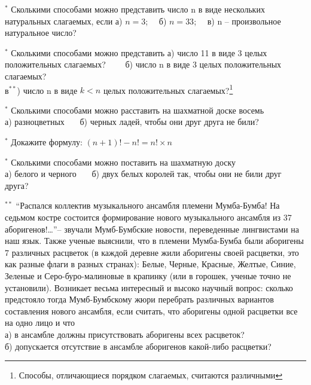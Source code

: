 
\begin{thm}
	$^{\ast}$ Сколькими способами можно представить число n в виде нескольких натуральных слагаемых, если а) $n = 3$;~~ б) $n = 33$;~~ в) n -- произвольное натуральное число?
\end{thm}

\begin{thm}
	$^{\ast}$ Сколькими способами можно представить
	а) число 11 в виде 3 целых положительных слагаемых?~~~~
	б) число n в виде 3 целых положительных слагаемых?\\
	в$^{\ast\ast}$) число n в виде  $k < n$  целых положительных слагаемых?\footnote{Способы, отличающиеся порядком слагаемых, считаются различными}
\end{thm}

\begin{thm}
	$^{\ast}$ Сколькими способами можно расставить на шахматной доске восемь\\ а) разноцветных~~~  б) черных ладей, чтобы они друг друга не били?
\end{thm}

\begin{thm}
	$^{\ast}$ Докажите формулу: $(n + 1)! - n! = n!\times n$
\end{thm}

\begin{thm}
	$^{\ast}$ Сколькими способами можно поставить на шахматную доску\\ а) белого и черного~~~ б) двух белых королей так, чтобы они не били друг друга?
\end{thm}

\begin{thm}$^{\ast\ast}$
	\textquotedblleft Распался коллектив музыкального ансамбля племени Мумба-Бумба! На седьмом костре состоится формирование нового музыкального ансамбля из 37 аборигенов!…\textquotedblright -- звучали Мумб-Бумбские новости, переведенные лингвистами на наш язык. Также ученые выяснили, что в племени Мумба-Бумба были аборигены 7 различных расцветок (в каждой деревне жили аборигены своей расцветки, это как разные флаги в разных странах): Белые, Черные, Красные, Желтые, Синие, Зеленые и Серо-буро-малиновые в крапинку (или в горошек, ученые точно не установили). Возникает весьма интересный и высоко научный вопрос: сколько предстояло тогда Мумб-Бумбскому жюри перебрать различных вариантов составления нового ансамбля, если считать, что аборигены одной расцветки все на одно лицо и что\\
	а) в ансамбле должны присутствовать аборигены всех расцветок?\\
	б) допускается отсутствие в ансамбле аборигенов какой-либо расцветки?
\end{thm}

